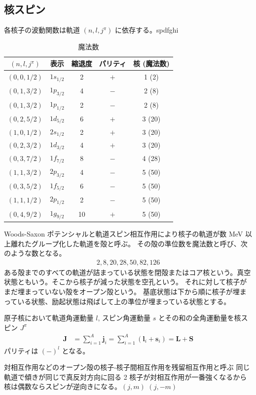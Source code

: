 \documentclass[uplatex,dvipdfmx,a4paper,11pt]{jlreq}
\numberwithin{equation}{section}
\theoremstyle{definition}
\begin{document}
\subsection{核スピン}
各核子の波動関数は軌道 $(n, l, j^\pi)$ に依存する。spdfghi
\begin{table}[hbtp]
  \centering
  \begin{tabular}{|c|c|c|c|c|}
    \hline
    $(n, l, j^\pi)$ & 表示         & 縮退度 & パリティ & 核 (魔法数) \\
    \hline \hline
    $(0, 0, 1/2)$   & $1s_{1/2}$ & 2   & $+$  & 1 (2)   \\
    $(0, 1, 3/2)$   & $1p_{3/2}$ & 4   & $-$  & 2 (8)   \\
    $(0, 1, 3/2)$   & $1p_{1/2}$ & 2   & $-$  & 2 (8)   \\
    $(0, 2, 5/2)$   & $1d_{5/2}$ & 6   & $+$  & 3 (20)  \\
    $(1, 0, 1/2)$   & $2s_{1/2}$ & 2   & $+$  & 3 (20)  \\
    $(0, 2, 3/2)$   & $1d_{3/2}$ & 4   & $+$  & 3 (20)  \\
    $(0, 3, 7/2)$   & $1f_{7/2}$ & 8   & $-$  & 4 (28)  \\
    $(1, 1, 3/2)$   & $2p_{3/2}$ & 4   & $-$  & 5 (50)  \\
    $(0, 3, 5/2)$   & $1f_{5/2}$ & 6   & $-$  & 5 (50)  \\
    $(1, 1, 1/2)$   & $2p_{1/2}$ & 2   & $-$  & 5 (50)  \\
    $(0, 4, 9/2)$   & $1g_{9/2}$ & 10  & $+$  & 5 (50)  \\
    \hline
  \end{tabular}
  \caption{魔法数}
  \label{table:magic number}
\end{table}

\begin{definition}[殻模型]
  Woods-Saxon ポテンシャルと軌道スピン相互作用により核子の軌道が数 \si{MeV} 以上離れたグループ化した軌道を殻と呼ぶ。
  その殻の準位数を魔法数と呼び、次のような数となる。
  \begin{align}
    2, 8, 20, 28, 50, 82, 126
  \end{align}
  ある殻までのすべての軌道が詰まっている状態を閉殻またはコア核という。真空状態ともいう。そこから核子が減った状態を空孔という。
  それに対して核子がまだ埋まっていない殻をオープン殻という。
  基底状態は下から順に核子が埋まっている状態、励起状態は飛ばして上の準位が埋まっている状態とする。
\end{definition}
\begin{definition}[核スピンとパリティ]
  原子核において軌道角運動量 $l$, スピン角運動量 $s$ とその和の全⾓運動量を核スピン $J^\pi$
  \begin{align}
    \bm{J} & = \sum_{i=1}^{A}\bm{j}_i = \sum_{i=1}^{A}(\bm{l}_i + \bm{s}_i) = \bm{L} + \bm{S}
  \end{align}
  パリティは $(-)^l$ となる。
\end{definition}
対相互作⽤などのオープン殻の核⼦-核⼦間相互作⽤を残留相互作⽤と呼ぶ
同じ軌道で傾きが同じで真反対⽅向に回る 2 核⼦が対相互作⽤が⼀番強くなるから核は偶数ならスピンが逆向きになる。$(j, m)$ $(j, -m)$
\end{document}
